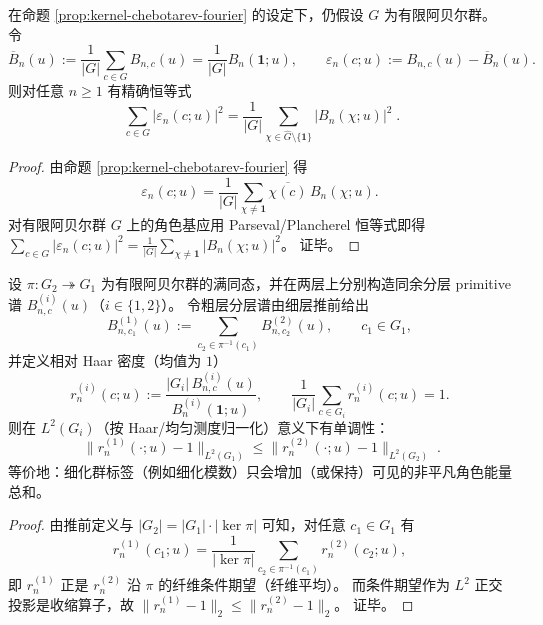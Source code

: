\begin{corollary}[Chebotarev--Plancherel 能量恒等式：空间侧均方偏差 \texorpdfstring{$=$}{=} 角色侧能量和]\label{cor:kernel-chebotarev-plancherel-energy}
在命题 \ref{prop:kernel-chebotarev-fourier} 的设定下，仍假设 \(G\) 为有限阿贝尔群。
令
\[
\overline{B}_n(u):=\frac{1}{|G|}\sum_{c\in G}B_{n,c}(u)=\frac{1}{|G|}B_n(\mathbf{1};u),
\qquad
\varepsilon_n(c;u):=B_{n,c}(u)-\overline{B}_n(u).
\]
则对任意 \(n\ge 1\) 有精确恒等式
\[
\boxed{\;
\sum_{c\in G}\bigl|\varepsilon_n(c;u)\bigr|^2
=\frac{1}{|G|}\sum_{\chi\in\widehat G\setminus\{\mathbf{1}\}}\bigl|B_n(\chi;u)\bigr|^2\; }.
\]
\end{corollary}
\begin{proof}
由命题 \ref{prop:kernel-chebotarev-fourier} 得
\[
\varepsilon_n(c;u)
=\frac{1}{|G|}\sum_{\chi\ne \mathbf{1}}\overline{\chi(c)}\,B_n(\chi;u).
\]
对有限阿贝尔群 \(G\) 上的角色基应用 Parseval/Plancherel 恒等式即得
\(
\sum_{c\in G}|\varepsilon_n(c;u)|^2=\frac{1}{|G|}\sum_{\chi\ne\mathbf{1}}|B_n(\chi;u)|^2
\)。
证毕。
\end{proof}

\begin{corollary}\label{cor:kernel-chebotarev-L2-monotone}
设 \(\pi:G_2\twoheadrightarrow G_1\) 为有限阿贝尔群的满同态，并在两层上分别构造同余分层 primitive 谱 \(B^{(i)}_{n,c}(u)\)（\(i\in\{1,2\}\)）。
令粗层分层谱由细层推前给出
\[
B^{(1)}_{n,c_1}(u):=\sum_{c_2\in \pi^{-1}(c_1)}B^{(2)}_{n,c_2}(u),
\qquad c_1\in G_1,
\]
并定义相对 Haar 密度（均值为 \(1\)）
\[
r^{(i)}_{n}(c;u):=\frac{|G_i|\,B^{(i)}_{n,c}(u)}{B^{(i)}_{n}(\mathbf{1};u)},
\qquad
\frac{1}{|G_i|}\sum_{c\in G_i}r^{(i)}_{n}(c;u)=1.
\]
则在 \(L^2(G_i)\)（按 Haar/均匀测度归一化）意义下有单调性：
\[
\boxed{\;
\bigl\|r^{(1)}_{n}(\cdot;u)-1\bigr\|_{L^2(G_1)}
\le
\bigl\|r^{(2)}_{n}(\cdot;u)-1\bigr\|_{L^2(G_2)}\; }.
\]
等价地：细化群标签（例如细化模数）只会增加（或保持）可见的非平凡角色能量总和。
\end{corollary}
\begin{proof}
由推前定义与 \(|G_2|=|G_1|\cdot|\ker\pi|\) 可知，对任意 \(c_1\in G_1\) 有
\[
r^{(1)}_{n}(c_1;u)
=\frac{1}{|\ker\pi|}\sum_{c_2\in\pi^{-1}(c_1)}r^{(2)}_{n}(c_2;u),
\]
即 \(r^{(1)}_{n}\) 正是 \(r^{(2)}_{n}\) 沿 \(\pi\) 的纤维条件期望（纤维平均）。
而条件期望作为 \(L^2\) 正交投影是收缩算子，故
\(
\|r^{(1)}_{n}-1\|_{2}\le \|r^{(2)}_{n}-1\|_{2}
\)。
证毕。
\end{proof}


